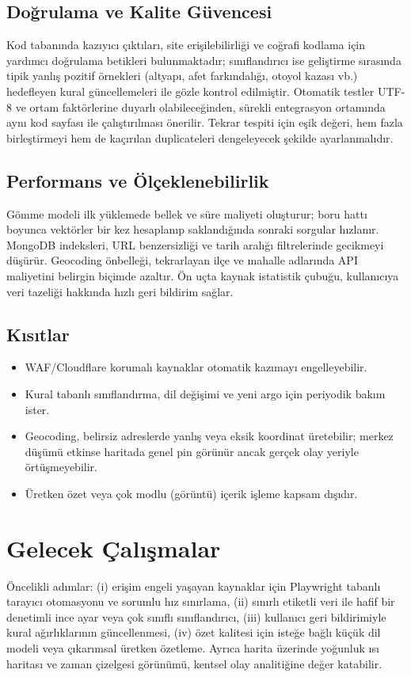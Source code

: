 \documentclass[conference,a4paper]{IEEEtran}
\begin{document}
\subsection{Doğrulama ve Kalite Güvencesi}
Kod tabanında kazıyıcı çıktıları, site erişilebilirliği ve coğrafi kodlama için yardımcı doğrulama betikleri bulunmaktadır; sınıflandırıcı ise geliştirme sırasında tipik yanlış pozitif örnekleri (altyapı, afet farkındalığı, otoyol kazası vb.) hedefleyen kural güncellemeleri ile gözle kontrol edilmiştir. Otomatik testler UTF-8 ve ortam faktörlerine duyarlı olabileceğinden, sürekli entegrasyon ortamında aynı kod sayfası ile çalıştırılması önerilir. Tekrar tespiti için eşik değeri, hem fazla birleştirmeyi hem de kaçırılan duplicateleri dengeleyecek şekilde ayarlanmalıdır.

\subsection{Performans ve Ölçeklenebilirlik}
Gömme modeli ilk yüklemede bellek ve süre maliyeti oluşturur; boru hattı boyunca vektörler bir kez hesaplanıp saklandığında sonraki sorgular hızlanır. MongoDB indeksleri, URL benzersizliği ve tarih aralığı filtrelerinde gecikmeyi düşürür. Geocoding önbelleği, tekrarlayan ilçe ve mahalle adlarında API maliyetini belirgin biçimde azaltır. Ön uçta kaynak istatistik çubuğu, kullanıcıya veri tazeliği hakkında hızlı geri bildirim sağlar.

\subsection{Kısıtlar}
\begin{itemize}
\item WAF/Cloudflare korumalı kaynaklar otomatik kazımayı engelleyebilir.
\item Kural tabanlı sınıflandırma, dil değişimi ve yeni argo için periyodik bakım ister.
\item Geocoding, belirsiz adreslerde yanlış veya eksik koordinat üretebilir; merkez düşümü etkinse haritada genel pin görünür ancak gerçek olay yeriyle örtüşmeyebilir.
\item Üretken özet veya çok modlu (görüntü) içerik işleme kapsam dışıdır.
\end{itemize}

\section{Gelecek Çalışmalar}
Öncelikli adımlar: (i) erişim engeli yaşayan kaynaklar için Playwright tabanlı tarayıcı otomasyonu ve sorumlu hız sınırlama, (ii) sınırlı etiketli veri ile hafif bir denetimli ince ayar veya çok sınıflı sınıflandırıcı, (iii) kullanıcı geri bildirimiyle kural ağırlıklarının güncellenmesi, (iv) özet kalitesi için isteğe bağlı küçük dil modeli veya çıkarımsal üretken özetleme. Ayrıca harita üzerinde yoğunluk ısı haritası ve zaman çizelgesi görünümü, kentsel olay analitiğine değer katabilir.
\end{document}
